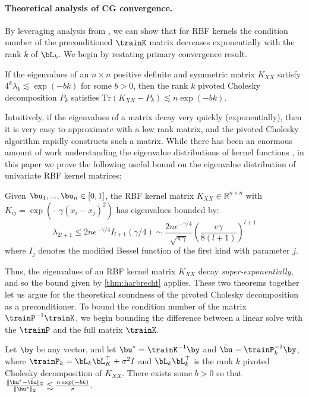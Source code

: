 \paragraph{Theoretical analysis of CG convergence.}
By leveraging analysis from \cite{harbrecht2012low}, we can show that for RBF kernels the condition number of the preconditioned $\trainK$ matrix decreases exponentially with the rank $k$ of $\bL_k$.
We begin by restating \cite{harbrecht2012low} primary convergence result.
%
\begin{theorem}
If the eigenvalues of an $n \times n$ positive definite and symmetric matrix $K_{XX}$ satisfy $4^{k}\lambda_{k} \lesssim \exp(-bk)$ for some $b>0$, then
the rank $k$ pivoted Cholesky decomposition $P_{k}$ satisfies $\textrm{Tr}(K_{XX} - P_{k}) \lesssim n\exp(-bk)$.
\label{thm:harbrecht}
\end{theorem}
Intuitively, if the eigenvalues of a matrix decay very quickly (exponentially), then it is very easy to approximate with a low rank matrix, and the pivoted Cholesky algorithm rapidly constructs such a matrix.
While there has been an enormous amount of work understanding the eigenvalue distributions of kernel functions , in this paper we prove the following useful bound on the eigenvalue distribution of univariate RBF kernel matrices:
%
\begin{theorem}
\label{thm:eigenvalue_bound}
Given $\bu_1,...,\bu_n \in [0, 1]$, the RBF kernel matrix $K_{XX} \in \mathbb{R}^{n \times n}$ with $K_{ij} = \exp \left(-\gamma(x_i - x_j)^{2}\right)$ has eigenvalues bounded by:
\begin{equation*}
    \lambda_{2l+1} \leq
    2n e^{-\gamma/4} I_{l+1}(\gamma/4) \sim
    \frac{2n e^{-\gamma/4}}{\sqrt{\pi\gamma}}
    \left( \frac{e\gamma}{8(l+1)} \right)^{l+1}
\end{equation*}
where $I_j$ denotes the modified Bessel function of the first kind with parameter $j$.
\end{theorem}
%
Thus, the eigenvalues of an RBF kernel matrix $K_{XX}$ decay \emph{super-exponentially}, and so the bound given by \cref{thm:harbrecht} applies.
These two theorems together let us argue for the theoretical soundness of the pivoted Cholesky decomposition as a preconditioner.
To bound the condition number of the matrix $\trainP^{-1} \trainK$, we begin bounding the difference between a linear solve with the $\trainP$ and the full matrix $\trainK$.
%
\begin{theorem}
Let $\by$ be any vector, and let $\bu^{*} = \trainK^{-1}\by$ and $\tilde{\bu} = \trainP_{k}^{-1}\by$, where $\trainP_{k}=\bL_{k} \bL_K^\top + \sigma^{2}I$ and $\bL_{k} \bL_k^\top$ is the rank $k$ pivoted Cholesky decomposition of $K_{XX}$.
There exists some $b>0$ so that $\frac{\Vert \bu^{*} - \tilde{\bu}\Vert_{2}}{\Vert\bu^{*}\Vert_{2}} \lesssim \frac{n\exp(-bk)}{\sigma}$.
\end{theorem}
